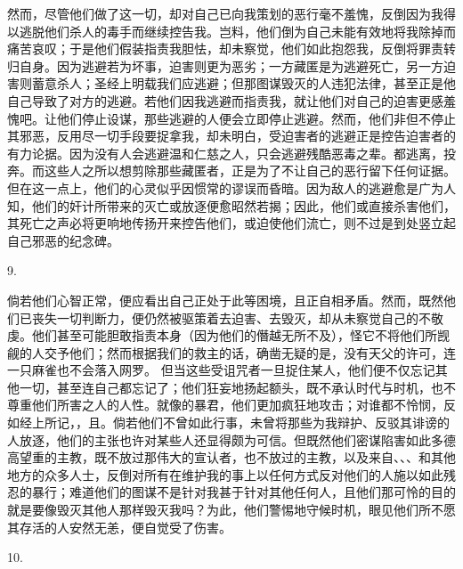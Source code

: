 然而，尽管他们做了这一切，却对自己已向我策划的恶行毫不羞愧，反倒因为我得以逃脱他们杀人的毒手而继续控告我。岂料，他们倒为自己未能有效地将我除掉而痛苦哀叹；于是他们假装指责我胆怯，却未察觉，他们如此抱怨我，反倒将罪责转归自身。因为逃避若为坏事，迫害则更为恶劣；一方藏匿是为逃避死亡，另一方迫害则蓄意杀人；圣经上明载我们应逃避；但那图谋毁灭的人违犯法律，甚至正是他自己导致了对方的逃避。若他们因我逃避而指责我，就让他们对自己的迫害更感羞愧吧。让他们停止设谋，那些逃避的人便会立即停止逃避。然而，他们非但不停止其邪恶，反用尽一切手段要捉拿我，却未明白，受迫害者的逃避正是控告迫害者的有力论据。因为没有人会逃避温和仁慈之人，只会逃避残酷恶毒之辈。都逃离，投奔。而这些人之所以想剪除那些藏匿者，正是为了不让自己的恶行留下任何证据。但在这一点上，他们的心灵似乎因惯常的谬误而昏暗。因为敌人的逃避愈是广为人知，他们的奸计所带来的灭亡或放逐便愈昭然若揭；因此，他们或直接杀害他们，其死亡之声必将更响地传扬开来控告他们，或迫使他们流亡，则不过是到处竖立起自己邪恶的纪念碑。\par

9. \par

倘若他们心智正常，便应看出自己正处于此等困境，且正自相矛盾。然而，既然他们已丧失一切判断力，便仍然被驱策着去迫害、去毁灭，却从未察觉自己的不敬虔。他们甚至可能胆敢指责本身（因为他们的僭越无所不及），怪它不将他们所觊觎的人交予他们；然而根据我们的救主的话，确凿无疑的是，没有天父的许可，连一只麻雀也不会落入网罗。 但当这些受诅咒者一旦捉住某人，他们便不仅忘记其他一切，甚至连自己都忘记了；他们狂妄地扬起额头，既不承认时代与时机，也不尊重他们所害之人的人性。就像的暴君，他们更加疯狂地攻击；对谁都不怜悯，反如经上所记，，且。倘若他们不曾如此行事，未曾将那些为我辩护、反驳其诽谤的人放逐，他们的主张也许对某些人还显得颇为可信。但既然他们密谋陷害如此多德高望重的主教，既不放过那伟大的宣认者，也不放过的主教，以及来自、、、和其他地方的众多人士，反倒对所有在维护我的事上以任何方式反对他们的人施以如此残忍的暴行；难道他们的图谋不是针对我甚于针对其他任何人，且他们那可怜的目的就是要像毁灭其他人那样毁灭我吗？为此，他们警惕地守候时机，眼见他们所不愿其存活的人安然无恙，便自觉受了伤害。\par

10. \par

